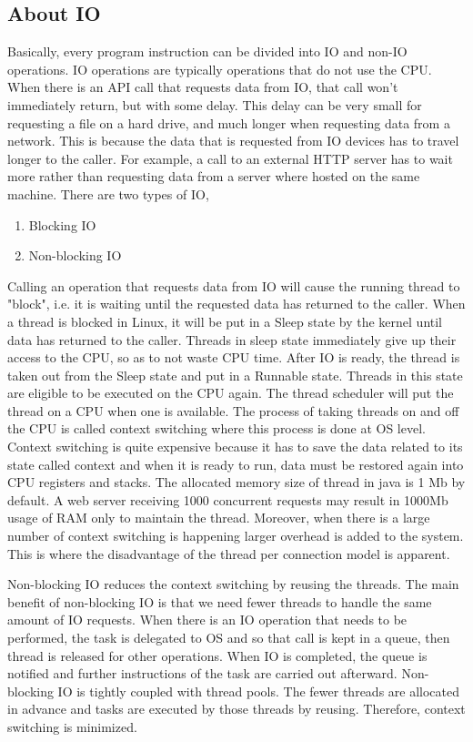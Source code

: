\subsection{About IO}

Basically, every program instruction can be divided into IO and non-IO operations. IO operations are
typically operations that do not use the CPU. When there is an API call that requests data from IO,
that call won’t immediately return, but with some delay. \cite{nb_algo} This delay can be very small for
requesting a file on a hard drive, and much longer when requesting data from a network. This is
because the data that is requested from IO devices has to travel longer to the caller. For example, a call to an external HTTP server has to wait more rather than requesting data from a server where hosted on the same machine.
There are two types of IO,

\begin{enumerate}
	\item Blocking IO
	\item Non-blocking IO
\end{enumerate}

Calling an operation that requests data from IO will cause the running thread to "block", i.e. it is
waiting until the requested data has returned to the caller. When a thread is blocked in Linux, it will be put in a Sleep state by the kernel
until data has returned to the caller. Threads in sleep state immediately give up their access to the CPU,
so as to not waste CPU time. After IO is ready, the thread is taken out from the Sleep state and put in a
Runnable state. Threads in this state are eligible to be executed on the CPU again. The thread
scheduler will put the thread on a CPU when one is available. The process of taking threads on and off
the CPU is called context switching where this process is done at OS level. Context switching is quite expensive because it has to save the data related to its state called context and when it is ready to run, data must be restored again into CPU registers and stacks. The allocated memory size of thread in java is 1 Mb by default. A web server receiving 1000 concurrent requests may result in 1000Mb usage of RAM only to maintain the thread. Moreover, when there is a large number of context switching is happening larger overhead is added to the system. This is where the disadvantage of the thread per connection model is apparent.

Non-blocking IO reduces the context switching by reusing the threads. The main benefit of non-blocking IO
is that we need fewer threads to handle the same amount of IO requests. When there is an IO operation that needs to be performed, the task is delegated to OS and so that call is kept in a queue, then thread is released for other operations. When IO is completed, the queue is notified and further instructions of the task are carried out afterward. Non-blocking IO is tightly coupled with thread pools. The fewer threads are allocated in advance and tasks are executed by those threads by reusing. Therefore, context switching is minimized.

